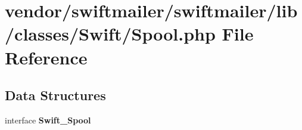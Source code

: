 \section{vendor/swiftmailer/swiftmailer/lib/classes/\+Swift/\+Spool.php File Reference}
\label{_spool_8php}
\subsection*{Data Structures}
\begin{DoxyCompactItemize}
\item 
interface {\bf Swift\+\_\+\+Spool}
\end{DoxyCompactItemize}
